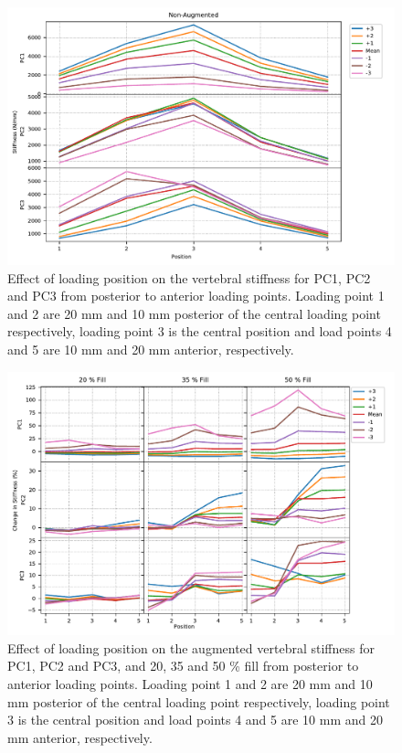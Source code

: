 \begin{figure}[p]
  \centering
  \includegraphics[width=.9\textheight, angle=90]{Chapters/Chapter_PCA_images/AP_LP_non_aug.pdf}
  \caption[Effect of loading position on the vertebral stiffness.]{Effect of
	loading position on the vertebral stiffness for PC1, PC2 and PC3 from
	posterior to anterior loading points. Loading point 1 and 2 are 20 mm
	and 10 mm posterior of the central loading point respectively, loading
	point 3 is the central position and load points 4 and 5 are 10 mm and
	20 mm anterior, respectively. }
  \label{fig:AP_LP_non_aug}
\end{figure}

\begin{figure}[p]
  \centering
  \includegraphics[width=.9\textheight, angle=90]{Chapters/Chapter_PCA_images/AP_change_from_non_aug.pdf}
  \caption[Effect of loading position on the augmented vertebral
	stiffness.]{Effect of loading position on the augmented vertebral
	stiffness for PC1, PC2 and PC3, and 20, 35 and 50 \% fill from
	posterior to anterior loading points. Loading point 1 and 2 are 20 mm
	and 10 mm posterior of the central loading point respectively, loading
	point 3 is the central position and load points 4 and 5 are 10 mm and
	20 mm anterior, respectively. }
  \label{fig:AP_change_from_non_aug}
\end{figure}
	
